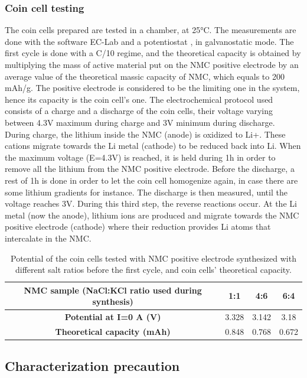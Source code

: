 \documentclass{article}
\begin{document}
\subsubsection{Coin cell testing}
The coin cells prepared are tested in a chamber, at 25°C. The measurements are done with the software EC-Lab and a potentiostat , in galvanostatic mode. The first cycle is done with a C/10 regime, and the theoretical capacity is obtained by multiplying the mass of active material put on the NMC positive electrode by an average value of the theoretical massic capacity of NMC, which equals to 200 mAh/g. The positive electrode is considered to be the limiting one in the system, hence its capacity is the coin cell’s one. 
The electrochemical protocol used consists of a charge and a discharge of the coin cells, their voltage varying between 4.3V maximum during charge and 3V minimum during discharge. During charge, the lithium inside the NMC (anode) is oxidized to Li+. These cations migrate towards the Li metal (cathode) to be reduced back into Li. When the maximum voltage (E=4.3V) is reached, it is held during 1h in order to remove all the lithium from the NMC positive electrode. Before the discharge, a rest of 1h is done in order to let the coin cell homogenize again, in case there are some lithium gradients for instance. The discharge is then measured, until the voltage reaches 3V. During this third step, the reverse reactions occur. At the Li metal (now the anode), lithium ions are produced and migrate towards the NMC positive electrode (cathode) where their reduction provides Li atoms that intercalate in the NMC\cite{Heuristics}.
\begin{table}[H]
  \centering
  \begin{tabular}{|c|c|c|c|}
    \hline
    \textbf{NMC sample (NaCl:KCl ratio used during synthesis)} & \textbf{1:1} & \textbf{4:6} & \textbf{6:4} \\
    \hline
    \textbf{Potential at I=0 A (V)} & 3.328 & 3.142 & 3.18 \\
    \hline
    \textbf{Theoretical capacity (mAh)} & 0.848 & 0.768 & 0.672 \\
    \hline
  \end{tabular}
  \caption{ Potential of the coin cells tested with NMC positive electrode synthesized with different salt ratios before the first cycle, and coin cells’ theoretical capacity.}
  \label{tab:NMC_samples}
\end{table}
\subsection{Characterization precaution}
\end{document}
